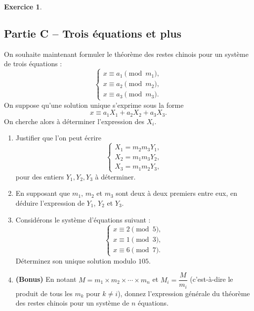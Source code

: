 \documentclass{article}
\theoremstyle{definition}
\newtheorem{exercice}{Exercice}
\begin{document}
\begin{exercice}
  \subsection*{Partie C -- Trois équations et plus}
  On souhaite maintenant formuler le théorème des restes chinois pour un système de trois équations :
  \[
  \begin{cases}
    x \equiv a_1 \pmod{m_1}, \\
    x \equiv a_2 \pmod{m_2}, \\
    x \equiv a_3 \pmod{m_3}.
  \end{cases}
  \]
  On suppose qu'une solution unique s'exprime sous la forme
  \[
  x \equiv a_1 X_1 + a_2 X_2 + a_3 X_3.
  \]
  On cherche alors à déterminer l'expression des \(X_i\).
  \begin{enumerate}
    \item Justifier que l'on peut écrire
    \[
    \begin{cases}
      X_1 = m_2m_3Y_1, \\
      X_2 = m_1m_3Y_2, \\
      X_3 = m_1m_2Y_3,
    \end{cases}
    \]
    pour des entiers \(Y_1, Y_2, Y_3\) à déterminer.
    \item En supposant que \(m_1\), \(m_2\) et \(m_3\) sont deux à deux premiers entre eux, en déduire l'expression de \(Y_1\), \(Y_2\) et \(Y_3\).
    \item Considérons le système d'équations suivant :
    \[
    \begin{cases}
    x \equiv 2 \pmod{5}, \\
    x \equiv 1 \pmod{3}, \\
    x \equiv 6 \pmod{7}.
    \end{cases}
    \]
    Déterminez son unique solution modulo \(105\).
    \item \textbf{(Bonus)} En notant \(M = m_1 \times m_2 \times \cdots \times m_n\) et \(M_i = \dfrac{M}{m_i}\) (c'est-à-dire le produit de tous les \(m_k\) pour \(k \neq i\)), donnez l'expression générale du théorème des restes chinois pour un système de \(n\) équations.
  \end{enumerate}
  
\end{exercice}

%
%
\newpage
\end{document}
